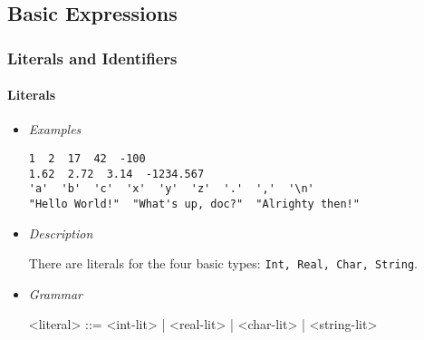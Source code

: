 \documentclass{article}
\begin{document}
\subsection{Basic Expressions}

\subsubsection{Literals and Identifiers}
\label{subsubsec:litsandidents}

\paragraph{Literals}
\begin{itemize}

\item \textit{Examples}
\begin{verbatim}
1  2  17  42  -100
1.62  2.72  3.14  -1234.567
'a'  'b'  'c'  'x'  'y'  'z'  '.'  ','  '\n'
"Hello World!"  "What's up, doc?"  "Alrighty then!"
\end{verbatim}

\item \textit{Description}

There are literals for the four basic types: \texttt{Int, Real, Char, String}.

\item \textit{Grammar}
\begin{grammar}
<literal> ::= <int-lit> | <real-lit> | <char-lit> | <string-lit>
\end{grammar}

\end{itemize}
\end{document}

